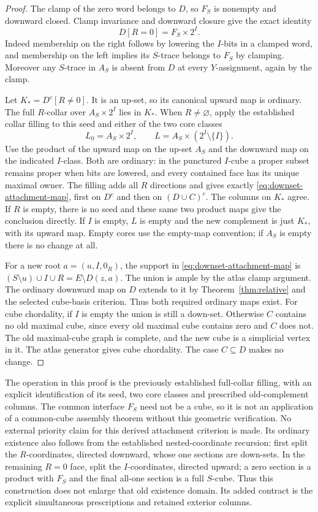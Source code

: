 \documentclass[11pt]{article}
\theoremstyle{definition}
\begin{document}
\begin{proof}
The clamp of the zero word belongs to $D$, so $F_S$ is nonempty and
downward closed. Clamp invariance and downward closure give the exact
identity
\[
 D[R=0]=F_S\times2^I.
\]
Indeed membership on the right follows by lowering the $I$-bits in a
clamped word, and membership on the left implies its $S$-trace belongs
to $F_S$ by clamping. Moreover any $S$-trace in $A_S$ is absent from
$D$ at every $Y$-assignment, again by the clamp.

Let $K_* = D^c[R\ne0]$. It is an up-set, so its canonical upward map
is ordinary. The full $R$-collar over $A_S\times2^I$ lies in $K_*$.
When $R\ne\varnothing$, apply the established collar filling to this
seed and either of the two core classes
\[
 L_0=A_S\times2^I,\qquad
 L=A_S\times(2^I\setminus\{I\}).
\]
Use the product of the upward map on the up-set $A_S$ and the downward
map on the indicated $I$-class. Both are ordinary: in the punctured
$I$-cube a proper subset remains proper when bits are lowered, and every
contained face has its unique maximal owner. The filling adds all $R$
directions and gives exactly \eqref{eq:downset-attachment-map}, first
on $D^c$ and then on $(D\cup C)^c$. The columns on $K_*$ agree.
If $R$ is empty, there is no seed and these same two product maps give
the conclusion directly. If $I$ is empty, $L$ is empty and the new
complement is just $K_*$, with its upward map. Empty cores use the
empty-map convention; if $A_S$ is empty there is no change at all.

For a new root $a=(u,I,0_R)$, the support in
\eqref{eq:downset-attachment-map} is
$(S\setminus u)\cup I\cup R=E\setminus D(z,a)$.
The union is ample by the atlas clamp argument. The ordinary downward
map on $D$ extends to it by Theorem~\ref{thm:relative} and the selected
cube-basis criterion. Thus both required ordinary maps exist.
For cube chordality, if $I$ is empty the union is still a down-set.
Otherwise $C$ contains no old maximal cube, since every old maximal cube
contains zero and $C$ does not. The old maximal-cube graph is complete,
and the new cube is a simplicial vertex in it. The atlas generator gives
cube chordality. The case $C\subseteq D$ makes no change.
\end{proof}

The operation in this proof is the previously established full-collar
filling, with an explicit identification of its seed, two core classes
and prescribed old-complement columns. The common interface $F_S$ need
not be a cube, so it is not an application of a common-cube assembly
theorem without this geometric verification. No external priority claim
for this derived attachment criterion is made.
Its ordinary existence also follows from the established nested-coordinate
recursion: first split the $R$-coordinates, directed downward, whose one
sections are down-sets. In the remaining $R=0$ face, split the
$I$-coordinates, directed upward; a zero section is a product with $F_S$
and the final all-one section is a full $S$-cube. Thus this construction
does not enlarge that old existence domain. Its added contract is the
explicit simultaneous prescriptions and retained exterior columns.
\end{document}
